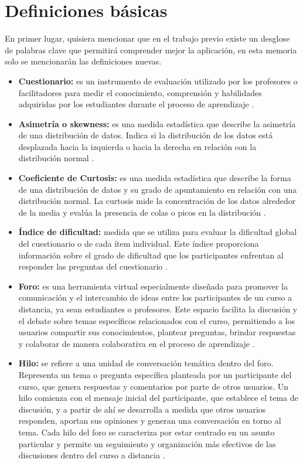 

\section{Definiciones básicas}

En primer lugar, quisiera mencionar que en el trabajo previo \cite{previotfg} existe un desglose de palabras clave que permitirá comprender mejor la aplicación, en esta memoria solo se mencionarán las definiciones nuevas.

\begin{itemize}
	\item \textbf{Cuestionario:} es un instrumento de evaluación utilizado por los profesores o facilitadores para medir el conocimiento, comprensión y habilidades adquiridas por los estudiantes durante el proceso de aprendizaje \cite{Lissette}.
	\item \textbf{Asimetría o skewness:} es una medida estadística que describe la asimetría de una distribución de datos. Indica si la distribución de los datos está desplazada hacia la izquierda o hacia la derecha en relación con la distribución normal \cite{skewness}.
	\item \textbf{Coeficiente de Curtosis:} es una medida estadística que describe la forma de una distribución de datos y su grado de apuntamiento en relación con una distribución normal. La curtosis mide la concentración de los datos alrededor de la media y evalúa la presencia de colas o picos en la distribución \cite{curtosis}. 
	\item \textbf{Índice de dificultad:} medida que se utiliza para evaluar la dificultad global del cuestionario o de cada ítem individual. Este índice proporciona información sobre el grado de dificultad que los participantes enfrentan al responder las preguntas del cuestionario \cite{indicededificultad}.
	\item \textbf{Foro:} es una herramienta virtual especialmente diseñada para promover la comunicación y el intercambio de ideas entre los participantes de un curso a distancia, ya sean estudiantes o profesores. Este espacio facilita la discusión y el debate sobre temas específicos relacionados con el curso, permitiendo a los usuarios compartir sus conocimientos, plantear preguntas, brindar respuestas y colaborar de manera colaborativa en el proceso de aprendizaje \cite{CHENG2011253}.
	\item \textbf{Hilo:} se refiere a una unidad de conversación temática dentro del foro. Representa un tema o pregunta específica planteada por un participante del curso, que genera respuestas y comentarios por parte de otros usuarios. Un hilo comienza con el mensaje inicial del participante, que establece el tema de discusión, y a partir de ahí se desarrolla a medida que otros usuarios responden, aportan sus opiniones y generan una conversación en torno al tema. Cada hilo del foro se caracteriza por estar centrado en un asunto particular y permite un seguimiento y organización más efectivos de las discusiones dentro del curso a distancia \cite{CHENG2011253}.  

\end{itemize}
